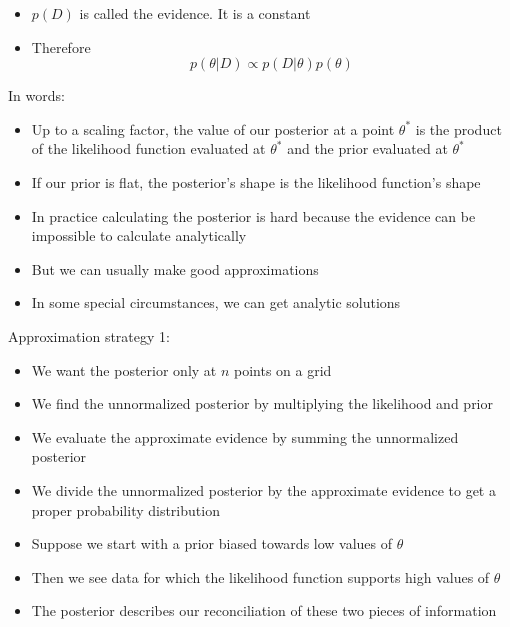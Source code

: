 \documentclass{beamer}
\begin{document}
\frame
{
  \begin{itemize}
    \item{$p(D)$ is called the evidence. It is a constant}
    \item{Therefore}
    \[
    p(\theta | D) \propto p(D | \theta) p(\theta)
    \]
  \end{itemize}
}

\frame
{
 In words:
 \begin{itemize}
   \item{Up to a scaling factor, the value of our posterior at a point $\theta^{*}$ is the product of the likelihood function evaluated at $\theta^{*}$ and the prior evaluated at $\theta^{*}$}
   \item{If our prior is flat, the posterior's shape is the likelihood function's shape}
 \end{itemize}
}

\frame
{
  \begin{itemize}
    \item{In practice calculating the posterior is hard because the evidence can be impossible to calculate analytically}
    \item{But we can usually make good approximations}
    \item{In some special circumstances, we can get analytic solutions}
  \end{itemize}
}

\frame
{
 Approximation strategy 1:
  \begin{itemize}
    \item{We want the posterior only at $n$ points on a grid}
    \item{We find the unnormalized posterior by multiplying the likelihood and prior}
    \item{We evaluate the approximate evidence by summing the unnormalized posterior}
    \item{We divide the unnormalized posterior by the approximate evidence to get a proper probability distribution}
  \end{itemize}
}

\frame
{
  \begin{itemize}
    \item{Suppose we start with a prior biased towards low values of $\theta$}
    \item{Then we see data for which the likelihood function supports high values of $\theta$}
    \item{The posterior describes our reconciliation of these two pieces of information}
  \end{itemize}
}
\end{document}
